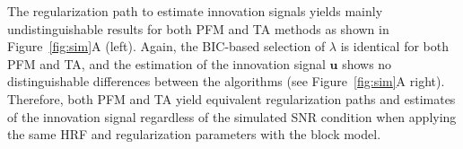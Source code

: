 The regularization path to estimate innovation signals yields mainly undistinguishable results for both PFM and TA methods as shown in Figure~\ref{fig:sim}A (left). Again, the BIC-based selection of $\lambda$ is identical for both PFM and TA, and the estimation of the innovation signal $\mathbf{u}$ shows no distinguishable differences between the algorithms (see Figure~\ref{fig:sim}A right). Therefore, both PFM and TA yield equivalent regularization paths and estimates of the innovation signal regardless of the simulated SNR condition when applying the same HRF and regularization parameters with the block model.


